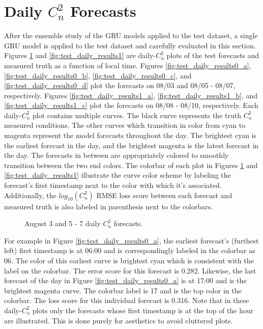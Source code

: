 \section{Daily $C_{n}^{2}$ Forecasts}
\label{sec:daily_cn2_forecasts}
After the ensemble study of the GRU models applied to the test dataset, a single GRU model is applied to the test dataset and carefully evaluated in this section. Figures \ref{fig:test_daily_results0} and \ref{fig:test_daily_results1} are daily-$C_{n}^{2}$ plots of the test forecasts and measured truth as a function of local time. Figures \ref{fig:test_daily_results0_a}, \ref{fig:test_daily_results0_b}, \ref{fig:test_daily_results0_c}, and \ref{fig:test_daily_results0_d} plot the forecasts on 08/03 and 08/05 - 08/07, respectively.  Figures \ref{fig:test_daily_results1_a}, \ref{fig:test_daily_results1_b}, and \ref{fig:test_daily_results1_c} plot the forecasts on 08/08 - 08/10, respectively. Each daily-$C_{n}^{2}$ plot contains multiple curves. The black curve represents the truth $C_{n}^{2}$ measured conditions. The other curves which transition in color from cyan to magenta represent the model forecasts throughout the day. The brightest cyan is the earliest forecast in the day, and the brightest magenta is the latest forecast in the day. The forecasts in between are appropriately colored to smoothly transition between the two end colors. The colorbar of each plot in Figures \ref{fig:test_daily_results0} and \ref{fig:test_daily_results1} illustrate the curve color scheme by labeling the forecast's first timestamp next to the color with which it's associated. Additionally, the $log_{10}(C_{n}^{2})$ RMSE loss score between each forecast and measured truth is also labeled in parenthesis next to the colorbars.
\begin{figure}[h!]
	\centering
	\hfill
	\hfill
	\caption{August 3 and 5 - 7 daily $C_{n}^{2}$ forecasts.}
	\label{fig:test_daily_results0}
\end{figure}
For example in Figure \ref{fig:test_daily_results0_a}, the earliest forecast's (furthest left) first timestamp is at 06:00 and is correspondingly labeled in the colorbar as 06. The color of this earliest curve is brightest cyan which is consistent with the label on the colorbar. The error score for this forecast is 0.282. Likewise, the last forecast of the day in Figure \ref{fig:test_daily_results0_a} is at 17:00 and is the brightest magenta curve. The colorbar label is 17 and is the top color in the colorbar. The loss score for this individual forecast is 0.316. Note that in these daily-$C_{n}^{2}$ plots only the forecasts whose first timestamp is at the top of the hour are illustrated. This is done purely for aesthetics to avoid cluttered plots.

